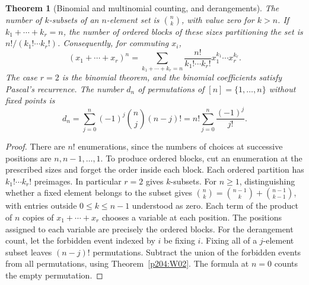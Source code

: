 \documentclass[11pt,oneside,openany]{book}
\theoremstyle{plain}
\newtheorem{theorem}{Theorem}[chapter]
\theoremstyle{definition}
\theoremstyle{remark}
\begin{document}
\begin{theorem}[Binomial and multinomial counting, and derangements]
\label{p204:W04}
The number of \(k\)-subsets of an \(n\)-element set is
\(\binom nk\), with value zero for \(k>n\). If \(k_1+\cdots+k_r=n\),
the number of ordered blocks of these sizes partitioning the set is
\(n!/(k_1!\cdots k_r!)\). Consequently, for commuting \(x_i\),
\[
 (x_1+\cdots+x_r)^n
 =\sum_{k_1+\cdots+k_r=n}
       \frac{n!}{k_1!\cdots k_r!}x_1^{k_1}\cdots x_r^{k_r}.
\]
The case \(r=2\) is the binomial theorem, and the binomial coefficients
satisfy Pascal's recurrence. The number \(d_n\) of permutations of
\([n]=\{1,\ldots,n\}\) without fixed points is
\[
 d_n=\sum_{j=0}^n(-1)^j\binom nj(n-j)!
     =n!\sum_{j=0}^n\frac{(-1)^j}{j!}.
\]
\end{theorem}
\begin{proof}
There are \(n!\) enumerations, since the numbers of choices at
successive positions are \(n,n-1,\ldots,1\). To produce ordered blocks,
cut an enumeration at the prescribed sizes and forget the order inside
each block. Each ordered partition has \(k_1!\cdots k_r!\) preimages.
In particular \(r=2\) gives \(k\)-subsets. For \(n\ge1\), distinguishing
whether a fixed element belongs to the subset gives
\(\binom nk=\binom{n-1}{k}+\binom{n-1}{k-1}\), with entries outside
\(0\le k\le n-1\) understood as zero. Each term of the product of
\(n\) copies of \(x_1+\cdots+x_r\) chooses a variable at each position.
The positions assigned to each variable are precisely the ordered
blocks. For the derangement count, let the forbidden event indexed by
\(i\) be fixing \(i\). Fixing all of a \(j\)-element subset leaves
\((n-j)!\) permutations. Subtract the union of the forbidden events
from all permutations, using Theorem~\ref{p204:W02}. The formula at
\(n=0\) counts the empty permutation.
\end{proof}
\end{document}
